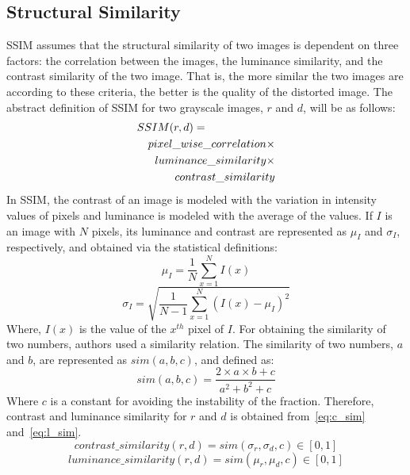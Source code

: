 \subsection{Structural Similarity}
SSIM assumes that the structural similarity of two images is dependent on three factors: the correlation between the images, the luminance similarity, and the contrast similarity of the two image. That is, the more similar the two images are according to these criteria, the better is the quality of the distorted image. The abstract definition of SSIM for two grayscale images, $r$ and $d$, will be as follows:
\begin{eqnarray*}
\lefteqn{SSIM(r, d) = }\\
& & pixel\_wise\_correlation\times\\
& & luminance\_similarity\times\\
& & contrast\_similarity
\end{eqnarray*}
In SSIM, the contrast of an image is modeled with the variation in intensity values of pixels and luminance is modeled with the average of the values. If $I$ is an image with $N$ pixels, its luminance and contrast are represented as $\mu_I$ and $\sigma_I$, respectively, and obtained via the statistical definitions:
\begin{equation}
    \mu_I = \frac{1}{N}\sum_{x=1}^{N}I(x)
    \label{eq:mu}
\end{equation}
\begin{equation}
    \sigma_I = \sqrt{\frac{1}{N-1}\sum_{x=1}^N(I(x)-\mu_I)^2}
    \label{eq:sigma}
\end{equation}
Where, $I(x)$ is the value of the $x^{th}$ pixel of $I$. For obtaining the similarity of two numbers, authors used a similarity relation. The similarity of two numbers, $a$ and $b$, are represented as $sim(a, b, c)$, and defined as:
\begin{equation}
    sim(a, b, c) = \frac{2\times a\times b+c}{a^2+b^2+c}
    \label{eq:sim}
\end{equation}
Where $c$ is a constant for avoiding the instability of the fraction. Therefore, contrast and luminance similarity for $r$ and $d$ is obtained from~\ref{eq:c_sim} and~\ref{eq:l_sim}.
\begin{equation}
    contrast\_similarity(r,d)=sim(\sigma_r, \sigma_d, c)\in [0, 1]
    \label{eq:c_sim}
\end{equation}
\begin{equation}
    luminance\_similarity(r, d) = sim(\mu_r, \mu_d, c)\in [0, 1]
    \label{eq:l_sim}
\end{equation}
